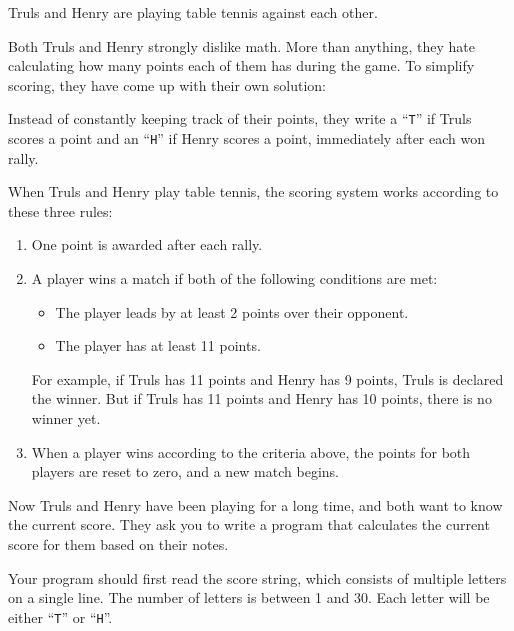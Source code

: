 \newpage
{}



Truls and Henry are playing table tennis against each other.

Both Truls and Henry strongly dislike math.  
More than anything, they hate calculating how many points each of them has during the game.  
To simplify scoring, they have come up with their own solution:

Instead of constantly keeping track of their points, they write a ``\texttt{T}'' if Truls
scores a point and an ``\texttt{H}'' if Henry scores a point, immediately after each won rally.

When Truls and Henry play table tennis, the scoring system works according to these three rules:  
\begin{enumerate}
  \item One point is awarded after each rally.  
  \item A player wins a match if both of the following conditions are met:  
  \begin{itemize}
    \item The player leads by at least 2 points over their opponent.  
    \item The player has at least 11 points.  
  \end{itemize}  
  For example, if Truls has 11 points and Henry has 9 points, Truls is declared the winner.
  But if Truls has 11 points and Henry has 10 points, there is no winner yet.  

  \item When a player wins according to the criteria above, the points for both players are reset to zero, and a new match begins.  
\end{enumerate}  

Now Truls and Henry have been playing for a long time, and both want to know the current score.  
They ask you to write a program that calculates the current score for them based on their notes.

Your program should first read the score string, which consists of multiple letters on a single line. The number of letters is between 1 and 30.  
Each letter will be either ``\texttt{T}'' or ``\texttt{H}''.

